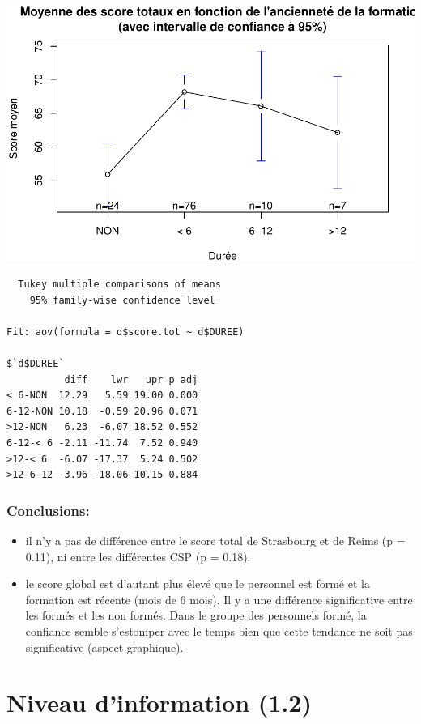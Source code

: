\documentclass[]{article}
\begin{document}
\includegraphics{analyse_files/figure-latex/unnamed-chunk-13-1.pdf}

\begin{verbatim}
  Tukey multiple comparisons of means
    95% family-wise confidence level

Fit: aov(formula = d$score.tot ~ d$DUREE)

$`d$DUREE`
          diff    lwr   upr p adj
< 6-NON  12.29   5.59 19.00 0.000
6-12-NON 10.18  -0.59 20.96 0.071
>12-NON   6.23  -6.07 18.52 0.552
6-12-< 6 -2.11 -11.74  7.52 0.940
>12-< 6  -6.07 -17.37  5.24 0.502
>12-6-12 -3.96 -18.06 10.15 0.884
\end{verbatim}

\subsubsection{Conclusions:}\label{conclusions}

\begin{itemize}
\itemsep1pt\parskip0pt
\item
  il n'y a pas de différence entre le score total de Strasbourg et de
  Reims (p = 0.11), ni entre les différentes CSP (p = 0.18).
\item
  le score global est d'autant plus élevé que le personnel est formé et
  la formation est récente (mois de 6 mois). Il y a une différence
  significative entre les formés et les non formés. Dans le groupe des
  personnels formé, la confiance semble s'estomper avec le temps bien
  que cette tendance ne soit pas significative (aspect graphique).
\end{itemize}

\section{Niveau d'information (1.2)}\label{niveau-dinformation-1.2}
\end{document}
